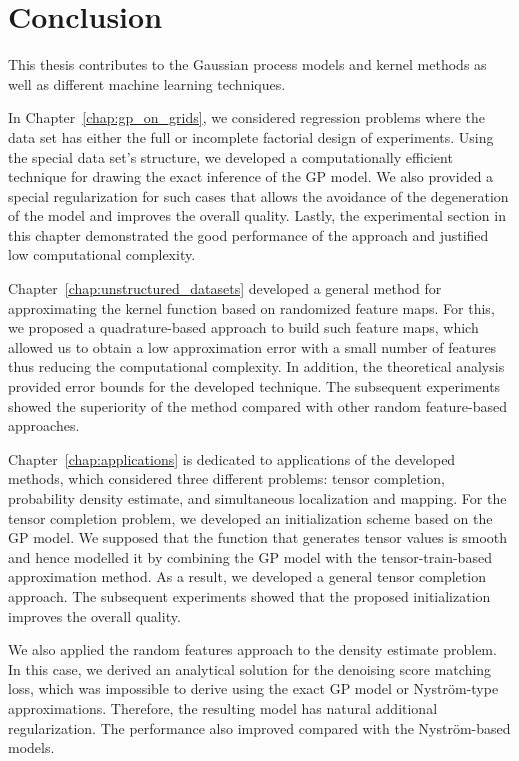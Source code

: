 \chapter{Conclusion}
\label{sec:conclusion}

This thesis contributes to the Gaussian process models and kernel methods
as well as different machine learning techniques.

In Chapter~\ref{chap:gp_on_grids}, we considered regression problems
where the data set has either the full or incomplete factorial
design of experiments.
Using the special data set's structure, we developed
a computationally efficient technique for drawing the exact inference of the GP model.
We also provided a special regularization for such cases
that allows the avoidance of the degeneration of the model and improves the overall quality.
Lastly, the experimental section in this chapter demonstrated
the good performance of the approach and justified low computational complexity.

Chapter~\ref{chap:unstructured_datasets} developed a general method
for approximating the kernel function based on randomized feature maps.
For this, we proposed a quadrature-based approach to build such feature maps, which
allowed us to obtain a low approximation error with a small number of features
thus reducing the computational complexity.
In addition, the theoretical analysis provided error bounds for the developed technique.
The subsequent experiments showed the superiority of the method compared with other
random feature-based approaches.

Chapter~\ref{chap:applications} is dedicated to applications of the developed methods, which
considered three different problems: tensor completion, probability density estimate,
and simultaneous localization and mapping.
For the tensor completion problem, we developed an initialization scheme based on the
GP model.
We supposed that the function that generates tensor values is smooth and hence
modelled it by combining the GP model with the tensor-train-based approximation method.
As a result, we developed a general tensor completion approach.
The subsequent experiments showed that the proposed initialization improves the overall quality.

We also applied the random features approach to the density estimate problem.
In this case, we derived an analytical solution for the denoising score matching loss,
which was impossible to derive using the exact GP model or Nystr{\"o}m-type approximations.
Therefore, the resulting model has natural additional regularization.
The performance also improved compared with the Nystr{\"o}m-based models.

